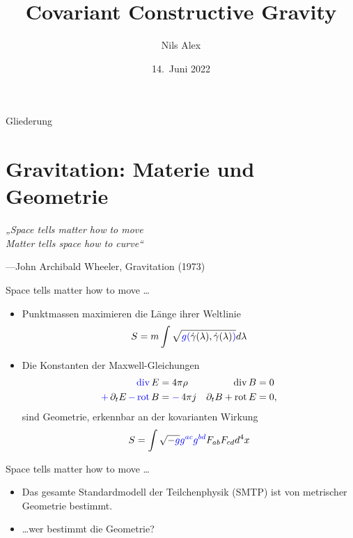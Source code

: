 \documentclass{beamer}
\title{Covariant Constructive Gravity}
\date{14.\ Juni 2022}
\author{Nils Alex}
\institute{FAU Erlangen-Nürnberg}
\begin{document}
    \maketitle

    \begin{frame}{Gliederung}
        \tableofcontents[pausesections]
    \end{frame}


    \section{Gravitation: Materie und Geometrie}\label{sec:materie-und-geometrie}

    \begin{frame}{}
        \Large
        \textit{„Space tells matter how to move \\
        Matter tells space how to curve“}

        \normalsize
        ---John Archibald Wheeler, Gravitation (1973)
    \end{frame}

    \begin{frame}{Space tells matter how to move \ldots}
        \begin{itemize}
            \item {\setlength{\belowdisplayskip}{-5pt}Punktmassen maximieren die {\color{blue}Länge} ihrer Weltlinie
                \[ S = m \int \sqrt{{\color{blue}g(}\dot\gamma(\lambda),\dot\gamma(\lambda){\color{blue})}} d\lambda \]} \pause
            \item Die Konstanten der Maxwell-Gleichungen
            \begin{align*}
                \mathop{\color{blue}\operatorname{div}} E &= 4\pi \rho & \operatorname{div} B &= 0 \\
                \mathop{\color{blue}+} \partial_t E \mathop{\color{blue}-} \mathop{\color{blue}\operatorname{rot}} B &= \mathop{\color{blue}-}4\pi j & \partial_t B + \operatorname{rot} E &= 0,
            \end{align*}
            sind Geometrie, erkennbar an der kovarianten Wirkung
            \[
                S = \int \sqrt{-\color{blue}g}{\color{blue}g^{ac}g^{bd}} F_{ab} F_{cd} d^4 x
            \]
        \end{itemize}
    \end{frame}

    \begin{frame}{Space tells matter how to move \ldots}
        \begin{itemize}
            \item Das gesamte Standardmodell der Teilchenphysik (SMTP) ist von metrischer Geometrie bestimmt. \pause
            \item \ldots wer bestimmt die Geometrie?
        \end{itemize}
    \end{frame}
\end{document}
